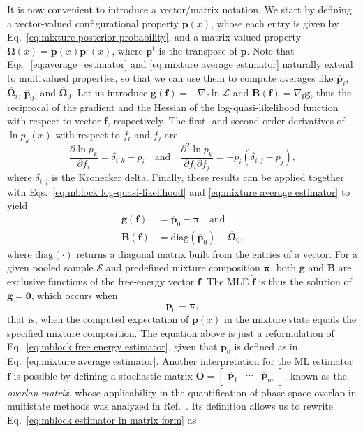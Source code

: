 \documentclass[aip,jcp,reprint,amsmath,amssymb]{revtex4-1}
\newcommand{\mt}[1]{\boldsymbol{\mathbf{#1}}}           %
\newcommand{\vt}[1]{\boldsymbol{\mathbf{#1}}}           %
\newcommand{\tr}[1]{#1^\text{t}}                        %
\begin{document}
It is now convenient to introduce a vector/matrix notation. We start by defining a vector-valued configurational property $\vt p(x)$, whose each entry is given by Eq.~\eqref{eq:mixture posterior probability}, and a matrix-valued property $\mt \Omega(x) = {\vt p}(x)\tr{\vt p}(x)$, where $\tr{\vt p}$ is the transpose of $\vt p$. Note that Eqs.~\eqref{eq:average_estimator} and \eqref{eq:mixture average estimator} naturally extend to multivalued properties, so that we can use them to compute averages like $\overline{\vt p}_i$, $\overline{\mt \Omega}_i$, $\overline{\vt p}_0$, and $\overline{\mt \Omega}_0$. Let us introduce $\vt g(\vt f) = - \nabla_{\vt f} \ln \mathcal L$ and $\mt B(\vt f) = \nabla_{\vt f} \vt g$, thus the reciprocal of the gradient and the Hessian of the log-quasi-likelihood function with respect to vector $\vt f$, respectively. The first- and second-order derivatives of $\ln p_k(x)$ with respect to $f_i$ and $f_j$ are
\begin{equation*}
\frac{\partial \ln p_k}{\partial f_i} = \delta_{i,k} - p_i \quad \text{and} \quad \frac{\partial^2\ln p_k}{\partial f_i \partial f_j} = -p_i(\delta_{i,j} - p_j),
\end{equation*}
where $\delta_{i,j}$ is the Kronecker delta. Finally, these results can be applied together with Eqs.~\eqref{eq:mblock log-quasi-likelihood} and \eqref{eq:mixture average estimator} to yield
\begin{align}
\vt g(\vt f) &= \overline{\vt p}_0 - \vt \pi \quad \text{and} \\
\mt B(\vt f) &= \text{diag}(\overline{\vt p}_0) - \overline{\mt \Omega}_0,
\end{align}
where $\text{diag}(\cdot)$ returns a diagonal matrix built from the entries of a vector. For a given pooled sample $\mathcal S$ and predefined mixture composition $\vt \pi$, both $\vt g$ and $\mt B$ are exclusive functions of the free-energy vector $\vt f$. The MLE $\hat{\vt f}$ is thus the solution of $\vt g = \vt 0$, which occurs when
\begin{equation}
\label{eq:mblock estimator in matrix form}
\overline{\vt p}_0 = \vt \pi,
\end{equation}
that is, when the computed expectation of $\vt p(x)$ in the mixture state equals the specified mixture composition. The equation above is just a reformulation of Eq.~\eqref{eq:mblock free energy estimator}, given that $\overline{\vt p}_0$ is defined as in Eq.~\eqref{eq:mixture average estimator}. Another interpretation for the ML estimator $\hat{\vt f}$ is possible by defining a stochastic matrix $\mt O = [\begin{array}{ccc} \overline{\vt p}_1 & \cdots & \overline{\vt p}_m \end{array}]$, known as the \textit{overlap matrix}, whose applicability in the quantification of phase-space overlap in multistate methods was analyzed in Ref.~. Its definition allows us to rewrite Eq.~\eqref{eq:mblock estimator in matrix form} as
\end{document}
